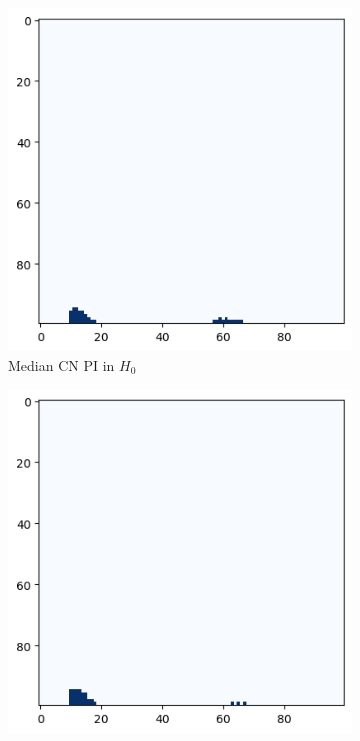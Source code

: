 \documentclass{article}
\begin{document}
\begin{figure}
  \centering \centering
  \begin{subfigure}{0.32\textwidth}
    \includegraphics[width=\textwidth]{figures/median_pls/median_pi_CN_h_0.png}
    \caption{Median CN PI in $H_0$}
  \end{subfigure}
  \begin{subfigure}{0.32\textwidth}
    \includegraphics[width=\textwidth]{figures/median_pls/median_pi_MCI_h_0.png}

\end{subfigure}
\end{figure}
\end{document}
